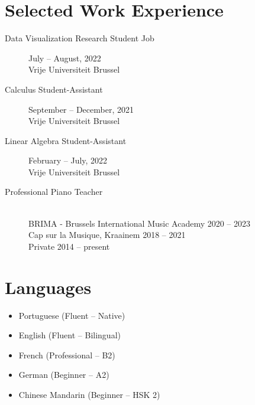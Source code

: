\documentclass[11pt, a4paper, sans]{article}
\newcommand{\mycolor}{mySlateBlue}           %
\newcommand{\thesectionicon}{}
\newcommand{\sectionicon}[1]{\renewcommand{\thesectionicon}{#1}}
\newcommand{\adjust}{\vspace{-1.01ex}}
\begin{document}
\section{Selected Work Experience}
\begin{description}

\item[\textcolor{\mycolor}{Data Visualization Research Student Job}]
  \hfill July -- August, 2022\\
  Vrije Universiteit Brussel
  \adjust
  
\item[\textcolor{\mycolor}{Calculus Student-Assistant}]
  \hfill September -- December, 2021\\
  Vrije Universiteit Brussel
  \adjust

\item[\textcolor{\mycolor}{Linear Algebra Student-Assistant}]
  \hfill February -- July, 2022\\
  Vrije Universiteit Brussel
  \adjust

\item[\textcolor{\mycolor}{Professional Piano Teacher}] \hfill \\
  BRIMA - Brussels International Music Academy \hfill 2020 -- 2023\\
  Cap sur la Musique, Kraainem \hfill 2018 -- 2021\\
  Private \hfill 2014 -- present  
  \adjust

\end{description}
\sectionicon{\faTools}
\sectionicon{\faLanguage}
\section{Languages}
\begin{minipage}[t]{0.50\textwidth}
\begin{itemize}
\setlength{\itemsep}{-5pt}
\item Portuguese (Fluent – Native)
\item English (Fluent – Bilingual)
\item French (Professional – B2)
\end{itemize}
\end{minipage}
\begin{minipage}[t]{0.50\textwidth}
\begin{itemize}
\setlength{\itemsep}{-5pt}
\item German (Beginner – A2)
\item Chinese Mandarin (Beginner – HSK 2)
\end{itemize}
\hfill
\end{minipage}
\sectionicon{\faGraduationCap}
\end{document}

